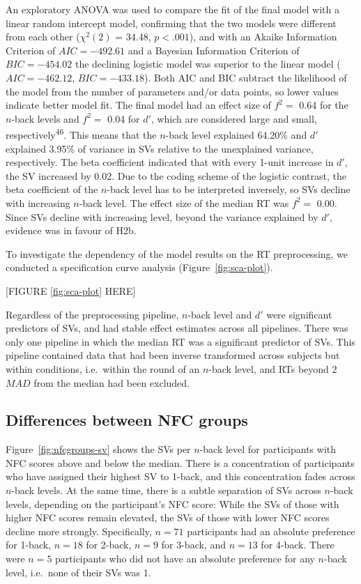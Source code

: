 \documentclass[
  man,floatsintext]{apa6}
\begin{document}
An exploratory ANOVA was used to compare the fit of the final model with a linear random intercept model, confirming that the two models were different from each other (\(\chi^2 (2)\) = 34.48, \(p<.001\)), and with an Akaike Information Criterion of \(AIC=-492.61\) and a Bayesian Information Criterion of \(BIC=-454.02\) the declining logistic model was superior to the linear model (\(AIC=-462.12\), \(BIC=-433.18\)).
Both AIC and BIC subtract the likelihood of the model from the number of parameters and/or data points, so lower values indicate better model fit.
The final model had an effect size of \(f^{2}=\) 0.64 for the \(n\)-back levels and \(f^{2}=\) 0.04 for \(d'\), which are considered large and small, respectively\textsuperscript{46}.
This means that the \(n\)-back level explained 64.20\% and \(d'\) explained 3.95\% of variance in SVs relative to the unexplained variance, respectively.
The beta coefficient indicated that with every 1-unit increase in \(d'\), the SV increased by 0.02.
Due to the coding scheme of the logistic contrast, the beta coefficient of the \(n\)-back level has to be interpreted inversely, so SVs decline with increasing \(n\)-back level.
The effect size of the median RT was \(f^{2}=\) 0.00.
Since SVs decline with increasing level, beyond the variance explained by \(d'\), evidence was in favour of H2b.

To investigate the dependency of the model results on the RT preprocessing, we conducted a specification curve analysis (Figure~\ref{fig:sca-plot}).

{[}FIGURE \ref{fig:sca-plot} HERE{]}

Regardless of the preprocessing pipeline, \(n\)-back level and \(d'\) were significant predictors of SVs, and had stable effect estimates across all pipelines.
There was only one pipeline in which the median RT was a significant predictor of SVs.
This pipeline contained data that had been inverse transformed across subjects but within conditions, i.e.~within the round of an \(n\)-back level, and RTs beyond 2 \(MAD\) from the median had been excluded.

\hypertarget{differences-between-nfc-groups}{%
\subsection{Differences between NFC groups}\label{differences-between-nfc-groups}}

Figure~\ref{fig:nfcgroups-sv} shows the SVs per \(n\)-back level for participants with NFC scores above and below the median.
There is a concentration of participants who have assigned their highest SV to 1-back, and this concentration fades across \(n\)-back levels.
At the same time, there is a subtle separation of SVs across \(n\)-back levels, depending on the participant's NFC score: While the SVs of those with higher NFC scores remain elevated, the SVs of those with lower NFC scores decline more strongly.
Specifically, \(n=71\) participants had an absolute preference for 1-back, \(n=18\) for 2-back, \(n=9\) for 3-back, and \(n=13\) for 4-back.
There were \(n=5\) participants who did not have an absolute preference for any \(n\)-back level, i.e.~none of their SVs was 1.
\end{document}
